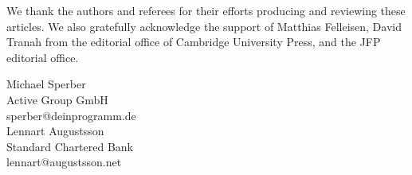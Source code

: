 \documentclass{jfp1}
\begin{document}
We thank the authors and referees for their efforts
producing and reviewing these articles.  We also gratefully
acknowledge the support of Matthias Felleisen, David Tranah from the
editorial office of Cambridge University Press, and the JFP editorial
office.

\begin{flushright}
 Michael Sperber\\
  Active Group GmbH\\
  sperber@deinprogramm.de\\[2mm]
  Lennart Augustsson\\
  Standard Chartered Bank\\
  lennart@augustsson.net
\end{flushright}
\end{document}
